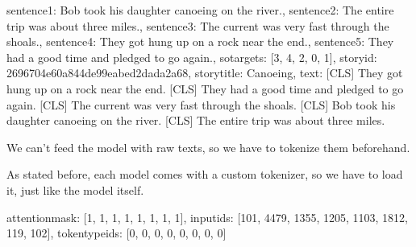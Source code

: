 \documentclass[letterpaper,10pt,english]{jupyterBook}
\begin{document}
\begin{sphinxVerbatimOutput}

\begin{sphinxVerbatim}[commandchars=\\\{\}]
\PYGZob{}\PYGZsq{}sentence1\PYGZsq{}: \PYGZsq{}Bob took his daughter canoeing on the river.\PYGZsq{},
 \PYGZsq{}sentence2\PYGZsq{}: \PYGZsq{}The entire trip was about three miles.\PYGZsq{},
 \PYGZsq{}sentence3\PYGZsq{}: \PYGZsq{}The current was very fast through the shoals.\PYGZsq{},
 \PYGZsq{}sentence4\PYGZsq{}: \PYGZsq{}They got hung up on a rock near the end.\PYGZsq{},
 \PYGZsq{}sentence5\PYGZsq{}: \PYGZsq{}They had a good time and pledged to go again.\PYGZsq{},
 \PYGZsq{}so\PYGZus{}targets\PYGZsq{}: [3, 4, 2, 0, 1],
 \PYGZsq{}storyid\PYGZsq{}: \PYGZsq{}2696704e\PYGZhy{}60a8\PYGZhy{}44de\PYGZhy{}99ea\PYGZhy{}bed2dada2a68\PYGZsq{},
 \PYGZsq{}storytitle\PYGZsq{}: \PYGZsq{}Canoeing\PYGZsq{},
 \PYGZsq{}text\PYGZsq{}: \PYGZsq{}[CLS] They got hung up on a rock near the end. [CLS] They had a good \PYGZsq{}
         \PYGZsq{}time and pledged to go again. [CLS] The current was very fast \PYGZsq{}
         \PYGZsq{}through the shoals. [CLS] Bob took his daughter canoeing on the \PYGZsq{}
         \PYGZsq{}river. [CLS] The entire trip was about three miles.\PYGZsq{}\PYGZcb{}
\end{sphinxVerbatim}
\end{sphinxVerbatimOutput}

\sphinxAtStartPar
We can’t feed the model with raw texts, so we have to tokenize them beforehand.

\sphinxAtStartPar
As stated before, each model comes with a custom tokenizer, so we have to load it, just like the model itself.
\begin{sphinxVerbatimInput}

\begin{sphinxVerbatim}[commandchars=\\\{\}]
   

   
  
\end{sphinxVerbatim}
\end{sphinxVerbatimInput}
\begin{sphinxVerbatimOutput}

\begin{sphinxVerbatim}[commandchars=\\\{\}]
\PYGZob{}\PYGZsq{}attention\PYGZus{}mask\PYGZsq{}: [1, 1, 1, 1, 1, 1, 1, 1],
 \PYGZsq{}input\PYGZus{}ids\PYGZsq{}: [101, 4479, 1355, 1205, 1103, 1812, 119, 102],
 \PYGZsq{}token\PYGZus{}type\PYGZus{}ids\PYGZsq{}: [0, 0, 0, 0, 0, 0, 0, 0]\PYGZcb{}
\end{sphinxVerbatim}
\end{sphinxVerbatimOutput}
\end{document}
